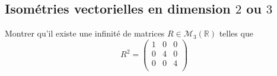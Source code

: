 \documentclass[a4paper,twoside,french,11pt]{VcCours}
\begin{document}


\newpage

\subsection{Isométries vectorielles en dimension \texorpdfstring{$2$ ou $3$}{2 ou 3}}


\begin{Exercice}{} Montrer qu'il existe une infinité de matrices $R \in \mathcal{M}_3(\mathbb{R})$ telles que
$$  R^2 = \begin{pmatrix}
1 & 0 & 0 \\
0 & 4 & 0 \\
0 & 0 & 4 \\
\end{pmatrix}$$
\end{Exercice}

\end{document}
